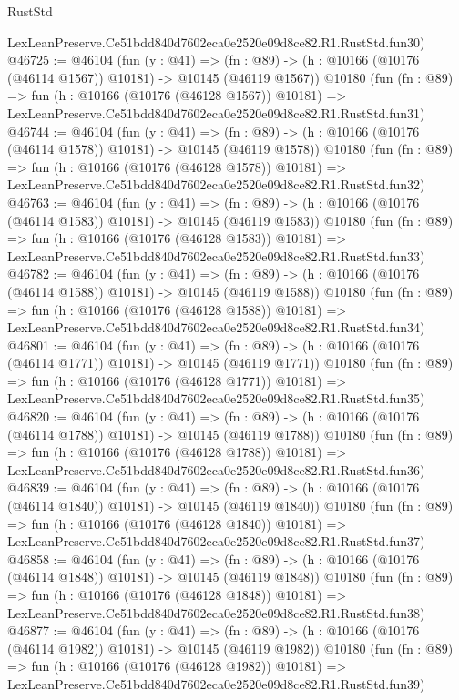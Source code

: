 \begin{lexlean}{RustStd}
\begin{coremodule}
    LexLeanPreserve.Ce51bdd840d7602eca0e2520e09d8ce82.R1.RustStd.fun30)
@46725 := @46104
    (fun (y : @41) =>
    (fn : @89) -> (h : @10166 (@10176 (@46114 @1567)) @10181) -> @10145 (@46119 @1567))
    @10180
    (fun (fn : @89) =>
    fun (h : @10166 (@10176 (@46128 @1567)) @10181) =>
    LexLeanPreserve.Ce51bdd840d7602eca0e2520e09d8ce82.R1.RustStd.fun31)
@46744 := @46104
    (fun (y : @41) =>
    (fn : @89) -> (h : @10166 (@10176 (@46114 @1578)) @10181) -> @10145 (@46119 @1578))
    @10180
    (fun (fn : @89) =>
    fun (h : @10166 (@10176 (@46128 @1578)) @10181) =>
    LexLeanPreserve.Ce51bdd840d7602eca0e2520e09d8ce82.R1.RustStd.fun32)
@46763 := @46104
    (fun (y : @41) =>
    (fn : @89) -> (h : @10166 (@10176 (@46114 @1583)) @10181) -> @10145 (@46119 @1583))
    @10180
    (fun (fn : @89) =>
    fun (h : @10166 (@10176 (@46128 @1583)) @10181) =>
    LexLeanPreserve.Ce51bdd840d7602eca0e2520e09d8ce82.R1.RustStd.fun33)
@46782 := @46104
    (fun (y : @41) =>
    (fn : @89) -> (h : @10166 (@10176 (@46114 @1588)) @10181) -> @10145 (@46119 @1588))
    @10180
    (fun (fn : @89) =>
    fun (h : @10166 (@10176 (@46128 @1588)) @10181) =>
    LexLeanPreserve.Ce51bdd840d7602eca0e2520e09d8ce82.R1.RustStd.fun34)
@46801 := @46104
    (fun (y : @41) =>
    (fn : @89) -> (h : @10166 (@10176 (@46114 @1771)) @10181) -> @10145 (@46119 @1771))
    @10180
    (fun (fn : @89) =>
    fun (h : @10166 (@10176 (@46128 @1771)) @10181) =>
    LexLeanPreserve.Ce51bdd840d7602eca0e2520e09d8ce82.R1.RustStd.fun35)
@46820 := @46104
    (fun (y : @41) =>
    (fn : @89) -> (h : @10166 (@10176 (@46114 @1788)) @10181) -> @10145 (@46119 @1788))
    @10180
    (fun (fn : @89) =>
    fun (h : @10166 (@10176 (@46128 @1788)) @10181) =>
    LexLeanPreserve.Ce51bdd840d7602eca0e2520e09d8ce82.R1.RustStd.fun36)
@46839 := @46104
    (fun (y : @41) =>
    (fn : @89) -> (h : @10166 (@10176 (@46114 @1840)) @10181) -> @10145 (@46119 @1840))
    @10180
    (fun (fn : @89) =>
    fun (h : @10166 (@10176 (@46128 @1840)) @10181) =>
    LexLeanPreserve.Ce51bdd840d7602eca0e2520e09d8ce82.R1.RustStd.fun37)
@46858 := @46104
    (fun (y : @41) =>
    (fn : @89) -> (h : @10166 (@10176 (@46114 @1848)) @10181) -> @10145 (@46119 @1848))
    @10180
    (fun (fn : @89) =>
    fun (h : @10166 (@10176 (@46128 @1848)) @10181) =>
    LexLeanPreserve.Ce51bdd840d7602eca0e2520e09d8ce82.R1.RustStd.fun38)
@46877 := @46104
    (fun (y : @41) =>
    (fn : @89) -> (h : @10166 (@10176 (@46114 @1982)) @10181) -> @10145 (@46119 @1982))
    @10180
    (fun (fn : @89) =>
    fun (h : @10166 (@10176 (@46128 @1982)) @10181) =>
    LexLeanPreserve.Ce51bdd840d7602eca0e2520e09d8ce82.R1.RustStd.fun39)

\end{coremodule}
\end{lexlean}
